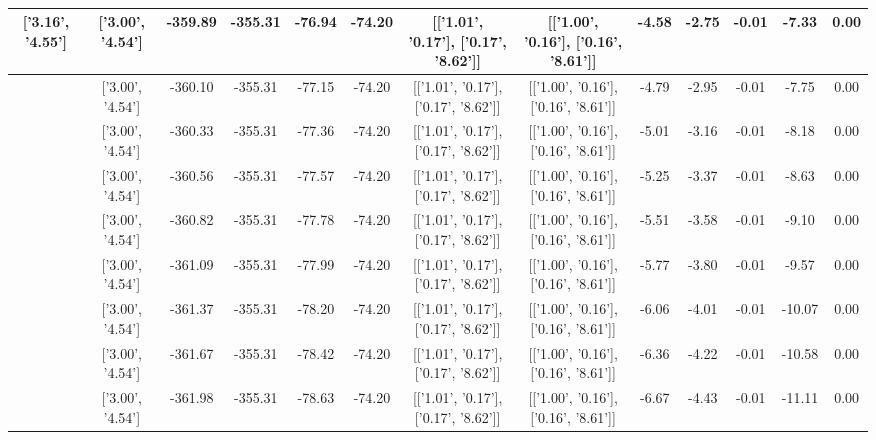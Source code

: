 \begin{table}[htbp]
\begin{adjustbox}{angle=90}
\begin{tabular}{|c|c|c|c|c|c|c|c|c|c|c|c|c|}
 ['3.16', '4.55'] & ['3.00', '4.54'] & -359.89 & -355.31 & -76.94 & -74.20 & [['1.01', '0.17'], ['0.17', '8.62']] & [['1.00', '0.16'], ['0.16', '8.61']] & -4.58 & -2.75 & -0.01 & -7.33 & 0.00\\ \hline
 ['3.17', '4.55'] & ['3.00', '4.54'] & -360.10 & -355.31 & -77.15 & -74.20 & [['1.01', '0.17'], ['0.17', '8.62']] & [['1.00', '0.16'], ['0.16', '8.61']] & -4.79 & -2.95 & -0.01 & -7.75 & 0.00\\ \hline
 ['3.19', '4.55'] & ['3.00', '4.54'] & -360.33 & -355.31 & -77.36 & -74.20 & [['1.01', '0.17'], ['0.17', '8.62']] & [['1.00', '0.16'], ['0.16', '8.61']] & -5.01 & -3.16 & -0.01 & -8.18 & 0.00\\ \hline
 ['3.20', '4.55'] & ['3.00', '4.54'] & -360.56 & -355.31 & -77.57 & -74.20 & [['1.01', '0.17'], ['0.17', '8.62']] & [['1.00', '0.16'], ['0.16', '8.61']] & -5.25 & -3.37 & -0.01 & -8.63 & 0.00\\ \hline
 ['3.21', '4.55'] & ['3.00', '4.54'] & -360.82 & -355.31 & -77.78 & -74.20 & [['1.01', '0.17'], ['0.17', '8.62']] & [['1.00', '0.16'], ['0.16', '8.61']] & -5.51 & -3.58 & -0.01 & -9.10 & 0.00\\ \hline
 ['3.22', '4.55'] & ['3.00', '4.54'] & -361.09 & -355.31 & -77.99 & -74.20 & [['1.01', '0.17'], ['0.17', '8.62']] & [['1.00', '0.16'], ['0.16', '8.61']] & -5.77 & -3.80 & -0.01 & -9.57 & 0.00\\ \hline
 ['3.23', '4.55'] & ['3.00', '4.54'] & -361.37 & -355.31 & -78.20 & -74.20 & [['1.01', '0.17'], ['0.17', '8.62']] & [['1.00', '0.16'], ['0.16', '8.61']] & -6.06 & -4.01 & -0.01 & -10.07 & 0.00\\ \hline
 ['3.25', '4.55'] & ['3.00', '4.54'] & -361.67 & -355.31 & -78.42 & -74.20 & [['1.01', '0.17'], ['0.17', '8.62']] & [['1.00', '0.16'], ['0.16', '8.61']] & -6.36 & -4.22 & -0.01 & -10.58 & 0.00\\ \hline
 ['3.26', '4.56'] & ['3.00', '4.54'] & -361.98 & -355.31 & -78.63 & -74.20 & [['1.01', '0.17'], ['0.17', '8.62']] & [['1.00', '0.16'], ['0.16', '8.61']] & -6.67 & -4.43 & -0.01 & -11.11 & 0.00\\ \hline
            \end{tabular}
        \end{adjustbox}
        \caption{}
        \label{}
    \end{table}
    
